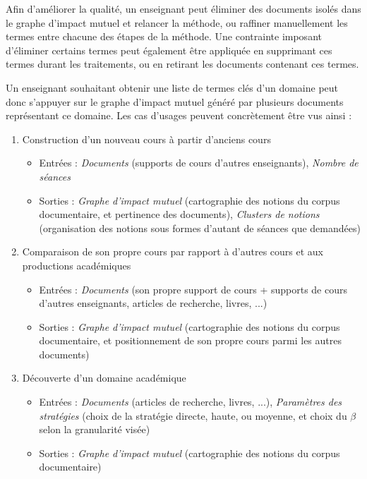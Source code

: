 \bigskip

Afin d'améliorer la qualité, un enseignant peut éliminer des documents isolés dans le graphe d'impact mutuel et relancer la méthode, ou raffiner manuellement les termes entre chacune des étapes de la méthode.
Une contrainte imposant d'éliminer certains termes peut également être appliquée en supprimant ces termes durant les traitements, ou en retirant les documents contenant ces termes.

Un enseignant souhaitant obtenir une liste de termes clés d'un domaine peut donc s'appuyer sur le graphe d'impact mutuel généré par plusieurs documents représentant ce domaine.
Les cas d'usages peuvent concrètement être vus ainsi :

\begin{enumerate}
\item Construction d'un nouveau cours à partir d'anciens cours
	\begin{itemize}
	\item Entrées : \textit{Documents} (supports de cours d'autres enseignants),
					\textit{Nombre de séances}
	\item Sorties : \textit{Graphe d'impact mutuel} (cartographie des notions du corpus documentaire, et pertinence des documents),
					\textit{Clusters de notions} (organisation des notions sous formes d'autant de séances que demandées)
	\end{itemize}

\item Comparaison de son propre cours par rapport à d'autres cours et aux productions académiques
	\begin{itemize}
	\item Entrées : \textit{Documents} (son propre support de cours + supports de cours d'autres enseignants, articles de recherche, livres, ...)
	\item Sorties : \textit{Graphe d'impact mutuel} (cartographie des notions du corpus documentaire, et positionnement de son propre cours parmi les autres documents)
	\end{itemize}

\item Découverte d'un domaine académique
	\begin{itemize}
	\item Entrées : \textit{Documents} (articles de recherche, livres, ...), \textit{Paramètres des stratégies} (choix de la stratégie directe, haute, ou moyenne, et choix du $ \beta $ selon la granularité visée)
	\item Sorties : \textit{Graphe d'impact mutuel} (cartographie des notions du corpus documentaire)
	\end{itemize}


\end{enumerate}
